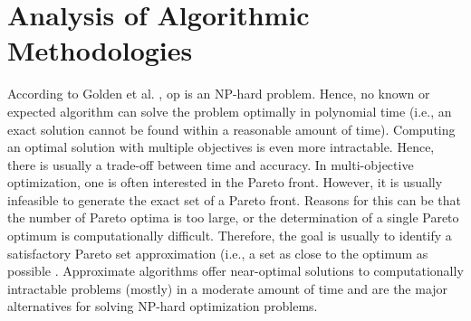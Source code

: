 \section{Analysis of Algorithmic Methodologies}\label{sec:alg_approaches}
According to Golden et al. \parencite{Golden1987TheProblem}, \gls{op} is an NP-hard problem. Hence, no known or expected algorithm can solve the problem optimally in polynomial time (i.e., an exact solution cannot be found within a reasonable amount of time). Computing an optimal solution with multiple objectives is even more intractable. Hence, there is usually a trade-off between time and accuracy. In multi-objective optimization, one is often interested in the Pareto front. However, it is usually infeasible to generate the exact set of a Pareto front. Reasons for this can be that the number of Pareto optima is too large, or the determination of a single Pareto optimum is computationally difficult. Therefore, the goal is usually to identify a satisfactory Pareto set approximation (i.e., a set as close to the optimum as possible \parencite{Fonseca2005AOptimizers}. Approximate algorithms offer near-optimal solutions to computationally intractable problems (mostly) in a moderate amount of time and are the major alternatives for solving NP-hard optimization problems.


